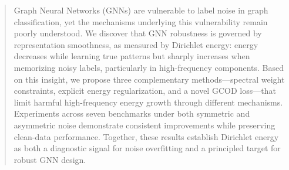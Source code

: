 \documentclass{article}
\theoremstyle{plain}
\theoremstyle{definition}
\theoremstyle{remark}
\begin{document}
\printAffiliationsAndNotice{}  %
\begin{abstract}
% 
Graph Neural Networks (GNNs) are vulnerable to label noise in graph classification, yet the mechanisms underlying this vulnerability remain poorly understood.
% 
We discover that GNN robustness is governed by representation smoothness, as measured by Dirichlet energy: energy decreases while learning true patterns but sharply increases when memorizing noisy labels, particularly in high-frequency components.
% 
Based on this insight, we propose three complementary methods---spectral weight constraints, explicit energy regularization, and a novel GCOD loss---that limit harmful high-frequency energy growth through different mechanisms.
% 
Experiments across seven benchmarks under both symmetric and asymmetric noise demonstrate consistent improvements while preserving clean-data performance.
% 
Together, these results establish Dirichlet energy as both a diagnostic signal for noise overfitting and a principled target for robust GNN design.
% 
\end{abstract}

\end{document}
